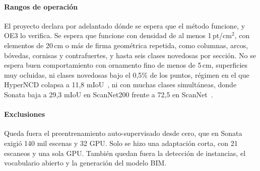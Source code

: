 \paragraph*{Rangos de operación}
El proyecto declara por adelantado dónde se espera que el método funcione, y OE3
lo verifica. Se espera que funcione con densidad de al menos 1\,pt/cm$^2$, con
elementos de 20\,cm o más de firma geométrica repetida, como columnas, arcos,
bóvedas, cornisas y contrafuertes, y hasta seis clases novedosas por sección. No
se espera buen comportamiento con ornamento fino de menos de 5\,cm, superficies
muy ocluidas, ni clases novedosas bajo el 0,5\% de los puntos, régimen en el que
HyperNCD colapsa a 11,8 mIoU~\cite{zhang2026hyperncd}, ni con muchas clases simultáneas,
donde Sonata baja a 29,3 mIoU en ScanNet200 frente a 72,5 en
ScanNet~\cite{wu2025sonata}.

\paragraph*{Exclusiones}
Queda fuera el preentrenamiento auto-supervisado desde cero, que en Sonata exigió
140 mil escenas y 32 GPU. Solo se hizo una adaptación corta, con 21 escaneos y una
sola GPU. También quedan fuera la detección de instancias, el vocabulario abierto y la
generación del modelo BIM.

\renewcommand{\thetable}{\arabic{chapter}.\arabic{table}}
\setcounter{table}{0}
